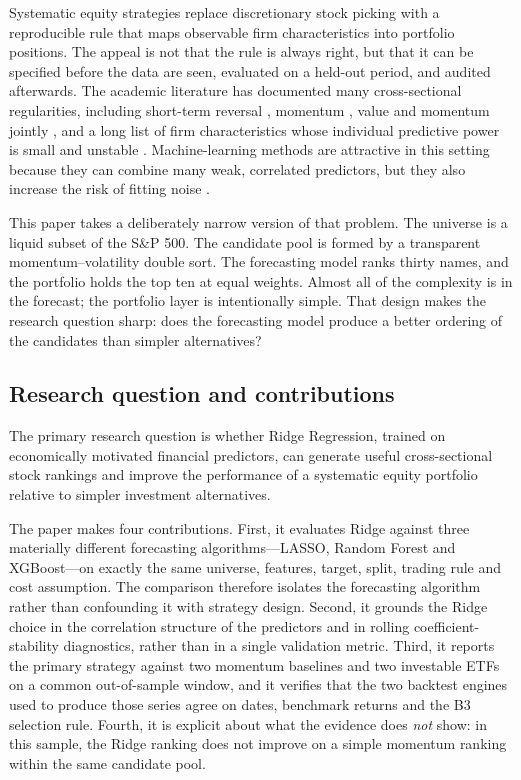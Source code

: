 \documentclass[11pt,a4paper]{article}
\begin{document}
Systematic equity strategies replace discretionary stock picking with a reproducible rule that maps observable firm characteristics into portfolio positions. The appeal is not that the rule is always right, but that it can be specified before the data are seen, evaluated on a held-out period, and audited afterwards. The academic literature has documented many cross-sectional regularities, including short-term reversal \citep{jegadeesh1990}, momentum \citep{jegadeesh1993}, value and momentum jointly \citep{asness2013}, and a long list of firm characteristics whose individual predictive power is small and unstable \citep{hou2020, feng2020}. Machine-learning methods are attractive in this setting because they can combine many weak, correlated predictors, but they also increase the risk of fitting noise \citep{gu2020}.

This paper takes a deliberately narrow version of that problem. The universe is a liquid subset of the S\&P 500. The candidate pool is formed by a transparent momentum--volatility double sort. The forecasting model ranks thirty names, and the portfolio holds the top ten at equal weights. Almost all of the complexity is in the forecast; the portfolio layer is intentionally simple. That design makes the research question sharp: does the forecasting model produce a better ordering of the candidates than simpler alternatives?

\subsection{Research question and contributions}

The primary research question is whether Ridge Regression, trained on economically motivated financial predictors, can generate useful cross-sectional stock rankings and improve the performance of a systematic equity portfolio relative to simpler investment alternatives.

The paper makes four contributions. First, it evaluates Ridge against three materially different forecasting algorithms---LASSO, Random Forest and XGBoost---on exactly the same universe, features, target, split, trading rule and cost assumption. The comparison therefore isolates the forecasting algorithm rather than confounding it with strategy design. Second, it grounds the Ridge choice in the correlation structure of the predictors and in rolling coefficient-stability diagnostics, rather than in a single validation metric. Third, it reports the primary strategy against two momentum baselines and two investable ETFs on a common out-of-sample window, and it verifies that the two backtest engines used to produce those series agree on dates, benchmark returns and the B3 selection rule. Fourth, it is explicit about what the evidence does \emph{not} show: in this sample, the Ridge ranking does not improve on a simple momentum ranking within the same candidate pool.
\end{document}
